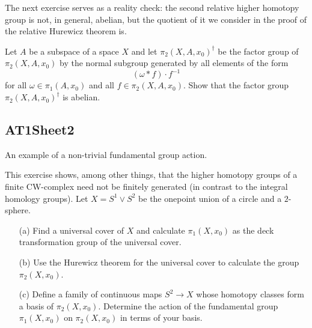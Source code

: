 \begin{sketch}
\end{sketch}

The next exercise serves as a reality check: the second relative higher homotopy group is not, in general, abelian, but the quotient of it we consider in the proof of the relative Hurewicz theorem is.

\label{exercise:AT1Sheet1.3}
Let $A$ be a subspace of a space $X$ and let $\pi_2(X,A,x_0)^\dagger$ be the factor
group of $\pi_2(X,A,x_0)$ by the normal subgroup generated by all elements of the form \[(\omega * f) \cdot f^{-1}\]
for all $\omega\in\pi_1(A,x_0)$ and all $f\in\pi_2(X,A,x_0)$. Show that the factor group $\pi_2(X,A,x_0)^\dagger$ is abelian.

\begin{sketch}
\end{sketch}

\subsection{AT1Sheet2}

An example of a non-trivial fundamental group action.

\label{exercise:AT1Sheet2.1}
This exercise shows, among other things, that the higher homotopy groups of a finite CW-complex need not be finitely generated (in contrast to the integral homology groups).
Let $X = S^{1} \vee S^{2}$ be the onepoint union of a circle and a $2$-sphere.
\begin{enumerate}
    \item[(a)] Find a universal cover of $X$ and calculate $\pi_{1}(X, x_{0})$ as the deck transformation group of the universal cover.
    \item[(b)] Use the Hurewicz theorem for the universal cover to calculate the group $\pi_{2}(X, x_{0})$.
    \item[(c)] Define a family of continuous maps $S^{2} \rightarrow X$ whose homotopy classes form a basis of $\pi_{2}(X, x_{0})$. Determine the action of the fundamental group $\pi_{1}(X, x_{0})$ on $\pi_{2}(X, x_{0})$ in terms of your basis.
\end{enumerate}

\begin{sketch}
\end{sketch}

